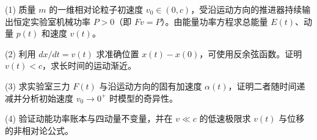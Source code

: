 (1) 质量 \(m\) 的一维相对论粒子初速度 \(v_0\in(0,c)\)，受沿运动方向的推进器持续输出恒定实验室机械功率 \(P>0\)（即 \(Fv=P\)）。由能量功率方程求总能量 \(E(t)\)、动量 \(p(t)\) 和速度 \(v(t)\)。

(2) 利用 \(dx/dt=v(t)\) 求准确位置 \(x(t)-x(0)\)，可使用反余弦函数。证明 \(v(t)<c\)，求长时间的运动渐近。

(3) 求实验室三力 \(F(t)\) 与沿运动方向的固有加速度 \(\alpha(t)\)，证明二者随时间递减并分析初始速度 \(v_0\to0^+\) 时模型的奇异性。

(4) 验证动能功率账本与四动量不变量，并在 \(v\ll c\) 的低速极限求 \(v(t)\) 与位移的非相对论公式。
